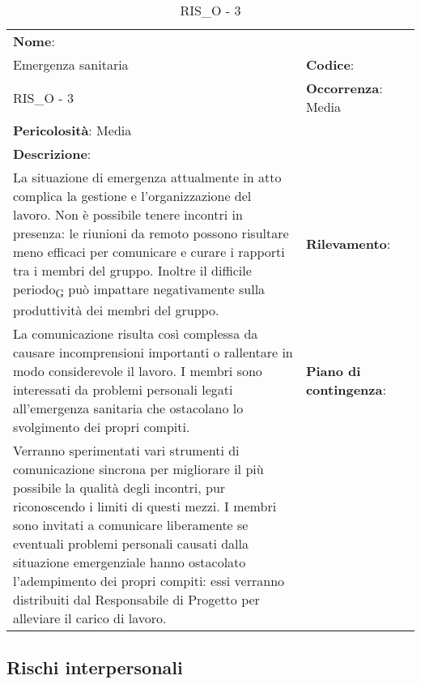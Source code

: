 \renewcommand{\arraystretch}{1.5}
\begin{longtable} { 
		>{\raggedright}p{} 
		>{\raggedright}p{} 
		>{\raggedright}p{}    }
	
	\caption{RIS\_O - 3} \endhead	
	
	
	\textbf{Nome}: \\ Emergenza sanitaria
	& \textbf{Codice}: \\ RIS\_O - 3
	& \textbf{Occorrenza}: Media \\ \textbf{Pericolosità}: Media
	
	\tabularnewline
	
	\textbf{Descrizione}: \\ La situazione di emergenza attualmente in atto complica la gestione e l'organizzazione del lavoro. Non è possibile tenere incontri in presenza: le riunioni da remoto possono risultare meno efficaci per comunicare e curare i rapporti tra i membri del gruppo. Inoltre il difficile periodo\textsubscript{G} può impattare negativamente sulla produttività dei membri del gruppo.
	&
	\textbf{Rilevamento}: \\ La comunicazione risulta così complessa da causare incomprensioni importanti o rallentare in modo considerevole il lavoro. I membri sono interessati da problemi personali legati all'emergenza sanitaria che ostacolano lo svolgimento dei propri compiti.
	& 
	\textbf{Piano di contingenza}: \\ Verranno sperimentati vari strumenti di comunicazione sincrona per migliorare il più possibile la qualità degli incontri, pur riconoscendo i limiti di questi mezzi. I membri sono invitati a comunicare liberamente se eventuali problemi personali causati dalla situazione emergenziale hanno ostacolato l'adempimento dei propri compiti: essi verranno distribuiti dal Responsabile di Progetto per alleviare il carico di lavoro.

	
\end{longtable}



\subsection{Rischi interpersonali}



